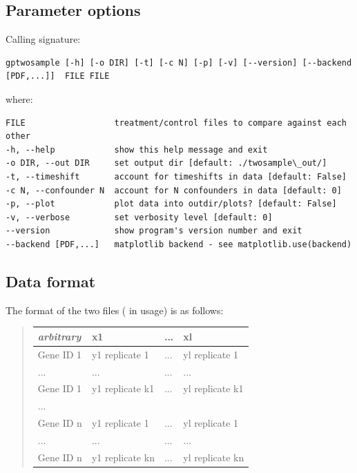\documentclass[letterpaper,10pt,english]{sphinxmanual}
\begin{document}
\subsection{Parameter options}
\label{usage:usage}\label{usage:parameter-options}\label{usage::doc}
Calling signature:

\begin{Verbatim}[commandchars=\\\{\}]
gptwosample [-h] [-o DIR] [-t] [-c N] [-p] [-v] [--version] [--backend [PDF,...]]  FILE FILE
\end{Verbatim}

where:

\begin{Verbatim}[commandchars=\\\{\}]
FILE                  treatment/control files to compare against each other
-h, --help            show this help message and exit
-o DIR, --out DIR     set output dir [default: ./twosample\_out/]
-t, --timeshift       account for timeshifts in data [default: False]
-c N, --confounder N  account for N confounders in data [default: 0]
-p, --plot            plot data into outdir/plots? [default: False]
-v, --verbose         set verbosity level [default: 0]
--version             show program's version number and exit
--backend [PDF,...]   matplotlib backend - see matplotlib.use(backend)
\end{Verbatim}


\subsection{Data format}
\label{usage:dataformat}\label{usage:data-format}
The format of the two  files ( in usage) is as follows:
\begin{quote}

\begin{tabulary}{\linewidth}{|L|L|L|L|}
\hline
\textbf{
\emph{arbitrary}
} & \textbf{
x1
} & \textbf{
...
} & \textbf{
xl
}\\\hline

Gene ID 1
 & 
y1 replicate 1
 & 
...
 & 
yl replicate 1
\\\hline

...
 & 
...
 & 
...
 & 
...
\\\hline

Gene ID 1
 & 
y1 replicate k1
 & 
...
 & 
yl replicate k1
\\\hline

...
 &  &  & \\\hline

Gene ID n
 & 
y1 replicate 1
 & 
...
 & 
yl replicate 1
\\\hline

...
 & 
...
 & 
...
 & 
...
\\\hline

Gene ID n
 & 
y1 replicate kn
 & 
...
 & 
yl replicate kn
\\\hline
\end{tabulary}

\end{quote}
\end{document}
